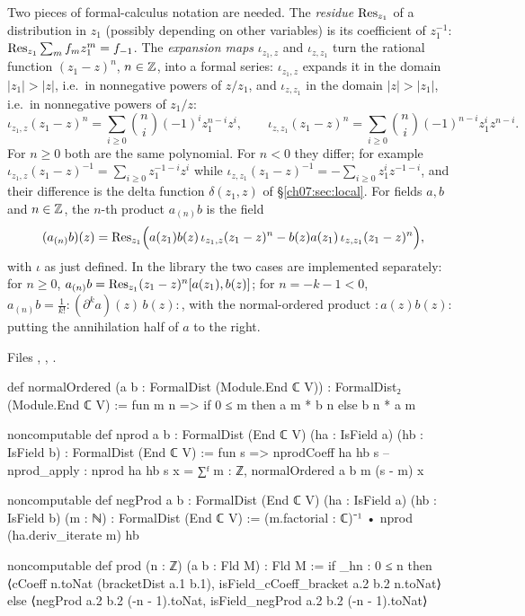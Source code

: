 Two pieces of formal-calculus notation are needed. The \emph{residue} $\operatorname{Res}_{z_1}$ of a
distribution in $z_1$ (possibly depending on other variables) is its coefficient of $z_1^{-1}$:
$\operatorname{Res}_{z_1}\sum_m f_m z_1^m = f_{-1}$. The \emph{expansion maps} $\iota_{z_1,z}$ and
$\iota_{z,z_1}$ turn the rational function $(z_1-z)^n$, $n\in{\mathbb{Z}}$, into a formal series:
$\iota_{z_1,z}$ expands it in the domain $|z_1|>|z|$, i.e.\ in nonnegative powers of $z/z_1$,
and $\iota_{z,z_1}$ in the domain $|z|>|z_1|$, i.e.\ in nonnegative powers of $z_1/z$:
\begin{equation*}
  \iota_{z_1,z}(z_1-z)^n = \sum_{i\ge0}\binom ni(-1)^iz_1^{n-i}z^i,\qquad
  \iota_{z,z_1}(z_1-z)^n = \sum_{i\ge0}\binom ni(-1)^{n-i}z_1^{i}z^{n-i}.
\end{equation*}
For $n\ge0$ both are the same polynomial. For $n<0$ they differ; for example
$\iota_{z_1,z}(z_1-z)^{-1} = \sum_{i\ge0}z_1^{-1-i}z^i$ while
$\iota_{z,z_1}(z_1-z)^{-1} = -\sum_{i\ge0}z_1^iz^{-1-i}$, and their difference is the delta
function $\delta(z_1,z)$ of \S\ref{ch07:sec:local}. For fields $a, b$ and $n\in{\mathbb{Z}}$, the $n$-th
product $a_{(n)}b$ is the field
\begin{equation}\label{ch07:eq:prod}
  (a_{(n)}b)(z) = \operatorname{Res}_{z_1}\Bigl( a(z_1)b(z)\,\iota_{z_1,z}(z_1-z)^n - b(z)a(z_1)\,
  \iota_{z,z_1}(z_1-z)^n\Bigr),
\end{equation}
with $\iota$ as just defined. In the library the two cases are
implemented separately: for $n\ge 0$, $a_{(n)}b = \operatorname{Res}_{z_1}(z_1-z)^n[a(z_1),b(z)]$; for
$n = -k-1<0$, $a_{(n)}b = \frac1{k!}{:}(\partial^k a)(z)\,b(z){:}$, with the normal-ordered
product ${:}a(z)b(z){:}$ putting the annihilation half of $a$ to the right.

\noindent Files , , .
\begin{leancode}
def normalOrdered (a b : FormalDist (Module.End ℂ V)) : FormalDist₂ (Module.End ℂ V) :=
  fun m n => if 0 ≤ m then a m * b n else b n * a m

noncomputable def nprod {a b : FormalDist (End ℂ V)}
    (ha : IsField a) (hb : IsField b) : FormalDist (End ℂ V) :=
  fun s => nprodCoeff ha hb s
-- nprod_apply : nprod ha hb s x = ∑ᶠ m : ℤ, normalOrdered a b m (s - m) x

noncomputable def negProd {a b : FormalDist (End ℂ V)} (ha : IsField a) (hb : IsField b)
    (m : ℕ) : FormalDist (End ℂ V) :=
  (m.factorial : ℂ)⁻¹ • nprod (ha.deriv_iterate m) hb

noncomputable def prod (n : ℤ) (a b : Fld M) : Fld M :=
  if _hn : 0 ≤ n then
    ⟨cCoeff n.toNat (bracketDist a.1 b.1), isField_cCoeff_bracket a.2 b.2 n.toNat⟩
  else
    ⟨negProd a.2 b.2 (-n - 1).toNat, isField_negProd a.2 b.2 (-n - 1).toNat⟩
\end{leancode}


